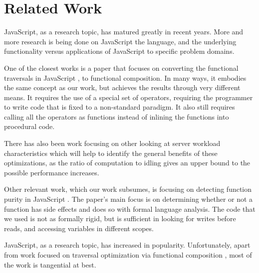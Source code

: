 \chapter{Related Work}

JavaScript, as a research topic, has matured greatly in recent years.  More and more research is being done on JavaScript the language, and the underlying functionality versus applications of JavaScript to specific problem domains.

One of the closest works is a paper that focuses on converting the functional traversals in JavaScript \cite{combinators15}, to functional composition.  In many ways, it embodies the same concept as our work, but achieves the results through very different means.  It requires the use of a special set of operators, requiring the programmer to write code that is fixed to a non-standard paradigm. It also still requires calling all the operators as functions instead of inlining the functions into procedural code.

There has also been work focusing on other looking at server workload characteristics \cite{workload14} which will help to identify the general benefits of these optimizations, as the ratio of computation to idling gives an upper bound to the possible performance increases.

Other relevant work, which our work subsumes, is focusing on detecting function purity in JavaScript \cite{purity15}.  The paper's main focus is on determining whether or not a function has side effects and does so with formal language analysis.  The code that we used is not as formally rigid, but is sufficient in looking for writes before reads, and accessing variables in different scopes.  

JavaScript, as a research topic, has increased in popularity. Unfortunately, apart from work focused on traversal optimization via functional composition \cite{combinators15}, most of the work is tangential at best.